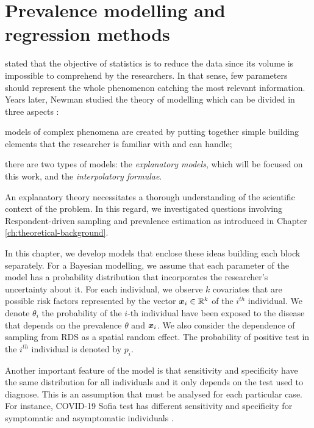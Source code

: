 \chapter{Prevalence modelling and regression methods}

\textcite[p. 311]{fisher1922mathematical} stated that the objective of
statistics is to reduce the data since its volume is impossible 
to comprehend by the researchers. In that sense, few parameters should represent the whole phenomenon catching the most relevant information. 
Years later, Newman studied the theory of modelling which can be divided 
in three aspects \cite[p. 161]{lehmann2012model}: 

\begin{alineas}
  \item models of complex phenomena are created by putting together 
  simple building elements that the researcher is familiar with and can 
  handle; 
  \item there are two types of models: the \textit{explanatory models}, 
  which will be focused on this work, and the \textit{interpolatory formulae}. 
  \item An explanatory theory necessitates a thorough understanding of the scientific context of the problem. In this regard, we investigated questions involving Respondent-driven sampling and prevalence estimation as introduced in Chapter \ref{ch:theoretical-background}. 
\end{alineas}

In this chapter, we develop models that enclose these ideas building each 
block separately. For a Bayesian modelling, we assume that each parameter
of the model has a probability distribution that incorporates the 
researcher's uncertainty about it. For each individual, we observe $k$ 
covariates that are possible risk factors represented by the vector 
$\boldsymbol{x}_i \in \mathbb{R}^{k}$ of the $i^{th}$ individual. We denote $\theta_i$ the 
probability of the $i$-th individual have been exposed to the disease
that depends on the prevalence $\theta$ and $\boldsymbol{x}_i$. We also consider the
dependence of sampling from RDS as a spatial random effect. The probability of
positive test in the $i^{th}$ individual is denoted by $p_i$.  

Another important feature of the model is that sensitivity and 
specificity have the same distribution for all individuals and 
it only depends on the test used to diagnose. This is an assumption 
that must be analysed for each particular case. For instance, COVID-19 
Sofia test has different sensitivity and specificity for symptomatic and 
asymptomatic individuals \cite[Table 1][p. 3]{mitchell2021performance}.  

